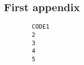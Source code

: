 \documentclass{mcmthesis}
\begin{document}
\newpage

\newpage
\begin{appendices}
	\section{First appendix}
	\begin{lstlisting}
		CODE1
		2
		3
		4
		5
	\end{lstlisting}
\end{appendices}
\end{document}
